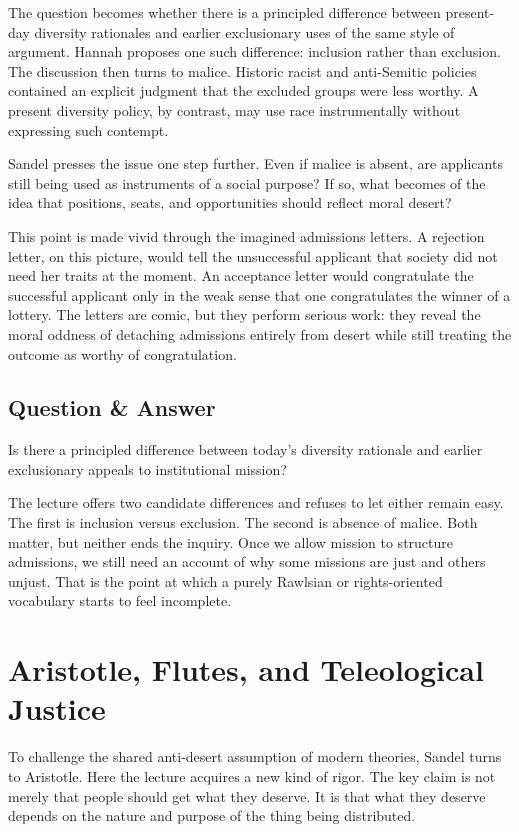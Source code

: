 The question becomes whether there is a principled difference between present-day diversity rationales and earlier exclusionary uses of the same style of argument. Hannah proposes one such difference: inclusion rather than exclusion. The discussion then turns to malice. Historic racist and anti-Semitic policies contained an explicit judgment that the excluded groups were less worthy. A present diversity policy, by contrast, may use race instrumentally without expressing such contempt.

Sandel presses the issue one step further. Even if malice is absent, are applicants still being used as instruments of a social purpose? If so, what becomes of the idea that positions, seats, and opportunities should reflect moral desert?

This point is made vivid through the imagined admissions letters. A rejection letter, on this picture, would tell the unsuccessful applicant that society did not need her traits at the moment. An acceptance letter would congratulate the successful applicant only in the weak sense that one congratulates the winner of a lottery. The letters are comic, but they perform serious work: they reveal the moral oddness of detaching admissions entirely from desert while still treating the outcome as worthy of congratulation.

\subsection{Question \& Answer}

Is there a principled difference between today's diversity rationale and earlier exclusionary appeals to institutional mission?

The lecture offers two candidate differences and refuses to let either remain easy. The first is inclusion versus exclusion. The second is absence of malice. Both matter, but neither ends the inquiry. Once we allow mission to structure admissions, we still need an account of why some missions are just and others unjust. That is the point at which a purely Rawlsian or rights-oriented vocabulary starts to feel incomplete.

\section{Aristotle, Flutes, and Teleological Justice}

To challenge the shared anti-desert assumption of modern theories, Sandel turns to Aristotle. Here the lecture acquires a new kind of rigor. The key claim is not merely that people should get what they deserve. It is that what they deserve depends on the nature and purpose of the thing being distributed.

